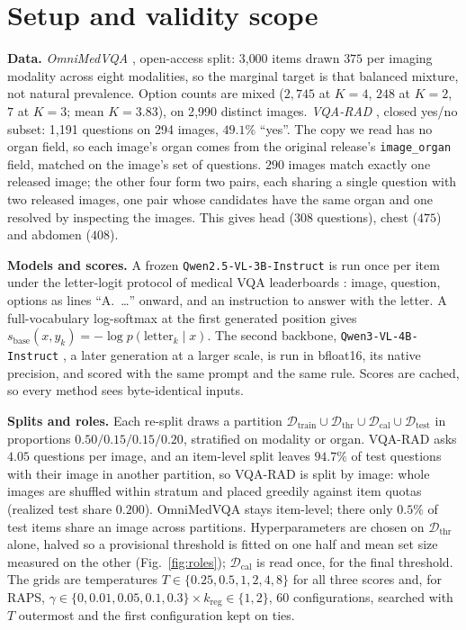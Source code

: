 \documentclass[a4paper,conference]{IEEEtran}
\newcommand{\Dtrain}{\mathcal{D}_{\mathrm{train}}}
\newcommand{\Dthr}{\mathcal{D}_{\mathrm{thr}}}
\newcommand{\Dcal}{\mathcal{D}_{\mathrm{cal}}}
\newcommand{\Dtest}{\mathcal{D}_{\mathrm{test}}}
\newcommand{\sbase}{s_{\mathrm{base}}}
\newcommand{\rtag}[1]{}
\begin{document}
\section{Setup and validity scope}\label{sec:setup}

\textbf{Data.} \emph{OmniMedVQA} \cite{hu2024omnimedvqa}, open-access split:
3{,}000 items drawn $375$ per imaging modality across eight modalities, so the
marginal target is that balanced mixture, not natural prevalence. Option counts
are mixed ($2{,}745$ at $K{=}4$, $248$ at $K{=}2$, $7$ at $K{=}3$; mean
$K=3.83$), on 2{,}990 distinct images. \emph{VQA-RAD} \cite{lau2018vqarad},
closed yes/no subset: 1{,}191 questions on 294 images, $49.1\%$ ``yes''. The
copy we read has no organ field, so each image's organ comes from the original
release's \texttt{image\_organ} field, matched on the image's set of questions.
$290$ images match exactly one released image; the other four form two pairs,
each sharing a single question with two released images, one pair whose
candidates have the same organ and one resolved by inspecting the images. This
gives head ($308$ questions), chest ($475$) and abdomen ($408$).\rtag{C1}

\textbf{Models and scores.} A frozen \texttt{Qwen2.5-VL-3B-Instruct}
\cite{bai2025qwen25vl} is run once per item under the letter-logit protocol of
medical VQA leaderboards \cite{lai2025medr1}: image, question, options as lines
``A.~\ldots'' onward, and an instruction to answer with the letter. A
full-vocabulary log-softmax at the first generated position gives
$\sbase(x,y_k)=-\log p(\text{letter}_k\mid x)$. The second backbone,
\texttt{Qwen3-VL-4B-Instruct} \cite{bai2025qwen3vl}, a later generation at a
larger scale, is run in bfloat16, its native precision, and scored with the
same prompt and the same rule.\rtag{R1.1} Scores are cached, so every method
sees byte-identical inputs.

\textbf{Splits and roles.} Each re-split draws a partition
$\Dtrain\cup\Dthr\cup\Dcal\cup\Dtest$ in proportions $0.50/0.15/0.15/0.20$,
stratified on modality or organ. VQA-RAD asks $4.05$ questions per image, and
an item-level split leaves $94.7\%$ of test questions with their image in
another partition, so VQA-RAD is split by image: whole images are shuffled
within stratum and placed greedily against item quotas (realized test share
$0.200$). OmniMedVQA stays item-level; there only $0.5\%$ of test items share
an image across partitions. Hyperparameters are chosen on $\Dthr$ alone, halved
so a provisional threshold is fitted on one half and mean set size measured on
the other (Fig.~\ref{fig:roles}); $\Dcal$ is read once, for the final
threshold. The grids are temperatures $T\in\{0.25,0.5,1,2,4,8\}$ for all three
scores and, for RAPS, $\gamma\in\{0,0.01,0.05,0.1,0.3\}\times
k_{\mathrm{reg}}\in\{1,2\}$, $60$ configurations, searched with $T$ outermost
and the first configuration kept on ties.\rtag{R2.2}
\end{document}
